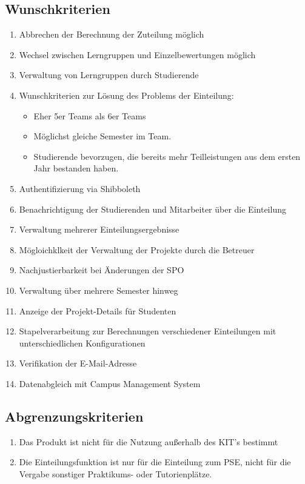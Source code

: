 \documentclass[parskip=full]{scrartcl}
\newcommand{\swtLabel}[1]{\textbf{\textbackslash #1\arabic*0\textbackslash}}
\begin{document}
\subsection{Wunschkriterien}
\begin{enumerate}[label=\swtLabel{W}]
  \item Abbrechen der Berechnung der Zuteilung möglich 
    \item Wechsel zwischen Lerngruppen und 
    Einzelbewertungen möglich %
    \item Verwaltung von Lerngruppen durch Studierende
    \item Wunschkriterien zur Lösung des Problems der Einteilung:
    \begin{itemize}
        \item Eher 5er Teams als 6er Teams
        \item Möglichst gleiche Semester im Team.
        \item Studierende bevorzugen, die bereits mehr Teilleistungen aus dem
        ersten Jahr bestanden haben.
    \end{itemize}    
    \item Authentifizierung via Shibboleth
    \item Benachrichtigung der Studierenden und Mitarbeiter über die Einteilung
    \item Verwaltung mehrerer Einteilungsergebnisse
    \item Mögloichklkeit der Verwaltung der Projekte durch die Betreuer  %
    \item Nachjustierbarkeit bei Änderungen der SPO %
    \item Verwaltung über mehrere Semester hinweg
    \item Anzeige der Projekt-Details für Studenten
    \item Stapelverarbeitung zur Berechnungen verschiedener Einteilungen mit
    unterschiedlichen Konfigurationen
    \item Verifikation der E-Mail-Adresse
    \item Datenabgleich mit Campus Management System %
    
    
    
\end{enumerate}

\subsection{Abgrenzungskriterien}
\begin{enumerate}[label=\swtLabel{A}]
 
  \item Das Produkt ist nicht für die Nutzung außerhalb des KIT's bestimmt

\item Die Einteilungsfunktion ist nur für die Einteilung zum PSE, nicht
für die Vergabe sonstiger Praktikums- oder Tutorienplätze.
  
\end{enumerate}
\end{document}
